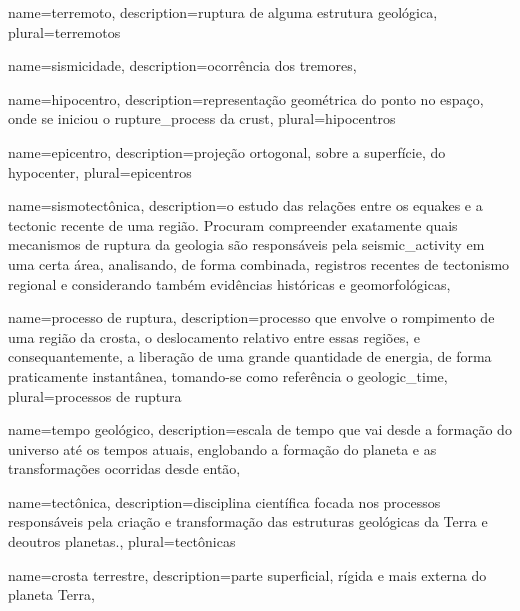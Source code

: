 {
	name={terremoto},
	description={ruptura de alguma estrutura geológica},
	plural={terremotos}
}

{
	name={sismicidade},
	description={ocorrência dos tremores},
}

{
	name={hipocentro},
	description={representação geométrica do ponto no espaço, onde 
		se iniciou o \gls{rupture_process} da \gls{crust}},
	plural={hipocentros}
}

{
	name={epicentro},
	description={projeção ortogonal, sobre a superfície, do \gls{hypocenter}},
	plural={epicentros}
}


{
	name={sismotectônica},
	description={o estudo das relações entre os \glspl{equake} e a \gls{tectonic} recente de uma região.
				 Procuram compreender exatamente quais mecanismos de ruptura da geologia são responsáveis pela \gls{seismic_activity}
				 em uma certa área, analisando, de forma combinada, registros recentes de tectonismo regional e considerando também
				 evidências históricas e geomorfológicas},
}


{
	name={processo de ruptura},
	description={processo que envolve o rompimento de uma região da crosta,
			o deslocamento relativo entre essas regiões, e consequantemente,
			a liberação de uma grande quantidade de energia, de forma praticamente
			instantânea, tomando-se como referência o \gls{geologic_time}},
	plural={processos de ruptura}
}


{
	name={tempo geológico},
	description={escala de tempo que vai desde a formação do universo até os tempos atuais,
				englobando a formação do planeta e as transformações ocorridas desde então},
}


{
	name={tect\^onica},
	description={disciplina científica focada nos processos respons\'aveis 
				 pela cria\c{c}\~ao e transforma\c{c}\~ao das estruturas geológicas da Terra e deoutros planetas.},
	plural={tect\^onicas}
}




{
	name={crosta terrestre},
	description={parte superficial, rígida e mais externa do planeta Terra},
}

